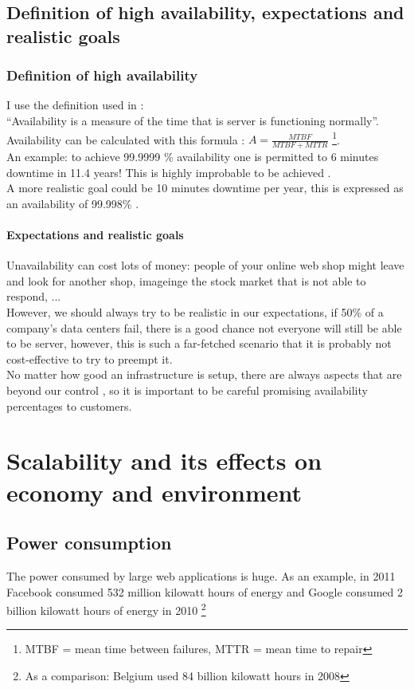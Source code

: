 \documentclass[12pt]{report}
\begin{document}
\section{Definition of high availability, expectations and realistic
  goals}
\subsection{Definition of high availability}
I use the definition used in \cite{ha_book}:\\
``Availability is a measure of the time that is server is functioning
normally''.\\
Availability can be calculated with this formula \cite{ha_book}:
$A=\frac{MTBF}{MTBF +
  MTTR}$ \footnote{MTBF = mean time between failures, MTTR = mean time to repair}.\\
An example: to achieve 99.9999 \% availability one is permitted to 6
minutes downtime in 11.4 years! This is highly improbable to be
achieved \cite{ha_book}.\\
A more realistic goal could be 10 minutes downtime per year, this is
expressed as an availability of 99.998\% \cite{ha_book}.

\subsubsection{Expectations and realistic goals}
Unavailability can cost lots of money: people of your online web shop
might leave and look for another shop, imageinge the stock market that is not
able to respond, ...\\
However, we should always try to be realistic in our expectations, if 50\%
of a company's data centers fail, there is a good chance not everyone
will still be able to be server, however, this is such a far-fetched
scenario that it is probably not cost-effective to try to preempt
it.\\
No matter how good an infrastructure is setup, there are always
aspects that are beyond our control \cite{black_swan}, so it is
important to be careful promising availability percentages to
customers. 

\chapter{Scalability and its effects on economy and environment}
\section{Power consumption}
The power consumed by large web applications is huge. As an
example, in 2011 Facebook consumed 532 million kilowatt hours of
energy and Google consumed 2 billion kilowatt hours of
energy in 2010 \cite{datacenter_power} \footnote{As a comparison:
  Belgium used 84 billion kilowatt hours in 2008}
\end{document}
